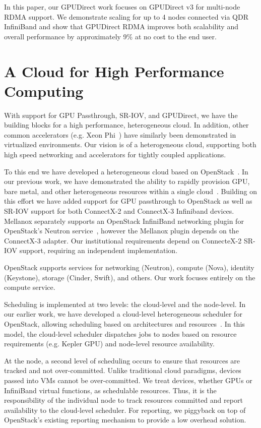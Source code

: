 In this paper, our GPUDirect work focuses on GPUDirect v3 for multi-node RDMA
support.  We demonstrate scaling for up to 4 nodes connected via QDR InfiniBand
and show that GPUDirect RDMA improves both scalability and overall performance
by approximately 9\% at no cost to the end user.

\section{A Cloud for High Performance Computing}
With support for GPU Passthrough, SR-IOV, and GPUDirect, we have the building
blocks for a high performance, heterogeneous cloud.  In addition, other common
accelerators (e.g. Xeon Phi~\cite{Phi}) have similarly been demonstrated in
virtualized environments.  Our vision is of a heterogeneous cloud, supporting
both high speed networking and accelerators for tightly coupled applications.

To this end we have developed a heterogeneous cloud based on
OpenStack~\cite{www-Openstack}.  In our previous work, we
have demonstrated the ability to rapidly provision GPU, bare metal, and other
heterogeneous resources within a single cloud~\cite{crago2011heterogeneous}.
Building on this effort we have added support for GPU passthrough to OpenStack
as well as SR-IOV support for both ConnectX-2 and ConnectX-3 Infiniband devices.
Mellanox separately supports an OpenStack InfiniBand networking plugin for
OpenStack's Neutron service~\cite{ML2}, however the Mellanox plugin depends on
the ConnectX-3 adapter.  Our institutional requirements depend on ConnecteX-2
SR-IOV support, requiring an independent implementation.

OpenStack supports services for networking (Neutron), compute (Nova), identity
(Keystone), storage (Cinder, Swift), and others.  Our work focuses entirely
on the compute service.  

Scheduling is implemented at two levels: the cloud-level and the node-level.  In
our earlier work, we have developed a cloud-level heterogeneous scheduler for OpenStack,
allowing scheduling based on architectures and
resources~\cite{crago2011heterogeneous}.  In this model, the cloud-level
scheduler dispatches jobs to nodes based on resource requirements (e.g. Kepler
GPU) and node-level resource availability.

At the node, a second level of scheduling occurs to ensure that resources are
tracked and not over-committed.  Unlike traditional cloud paradigms, devices
passed into VMs cannot be over-committed.  We treat devices, whether GPUs or
InfiniBand virtual functions, as schedulable resources.  Thus, it is the responsibility of the
individual node to track resources committed and report availability to the
cloud-level scheduler.  For reporting, we piggyback on top of OpenStack's
existing reporting mechanism to provide a low overhead solution.


